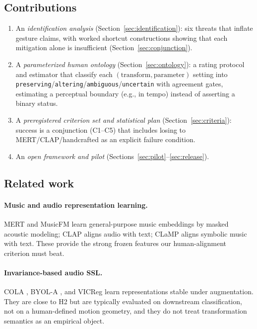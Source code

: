 \documentclass[11pt]{article}
\begin{document}
\subsection{Contributions}
\begin{enumerate}
  \item An \emph{identification analysis} (Section~\ref{sec:identification}): six
  threats that inflate gesture claims, with worked shortcut constructions showing
  that each mitigation alone is insufficient (Section~\ref{sec:conjunction}).
  \item A \emph{parameterized human ontology} (Section~\ref{sec:ontology}): a
  rating protocol and estimator that classify each
  $(\text{transform},\text{parameter})$ setting into
  \texttt{preserving}/\texttt{altering}/\texttt{ambiguous}/\texttt{uncertain} with
  agreement gates, estimating a perceptual boundary (e.g., in tempo) instead of
  asserting a binary status.
  \item A \emph{preregistered criterion set and statistical plan}
  (Section~\ref{sec:criteria}): success is a conjunction (C1--C5) that includes
  losing to MERT/CLAP/handcrafted as an explicit failure condition.
  \item An \emph{open framework and pilot} (Sections~\ref{sec:pilot}--\ref{sec:release}).
\end{enumerate}

\subsection{Related work}
\paragraph{Music and audio representation learning.}
MERT \citep{li2024mert} and MusicFM \citep{won2024musicfm} learn general-purpose
music embeddings by masked acoustic modeling; CLAP
\citep{elizalde2023clap,wu2023laionclap} aligns audio with text; CLaMP
\citep{wu2023clamp} aligns symbolic music with text. These provide the strong
frozen features our human-alignment criterion must beat.

\paragraph{Invariance-based audio SSL.}
COLA \citep{saeed2021cola}, BYOL-A \citep{niizumi2021byola}, and VICReg
\citep{bardes2022vicreg} learn representations stable under augmentation. They are
close to H2 but are typically evaluated on downstream classification, not on a
human-defined motion geometry, and they do not treat transformation semantics as
an empirical object.
\end{document}

